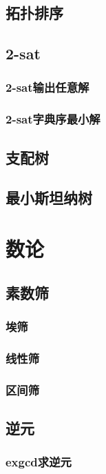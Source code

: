 ﻿\documentclass[a4paper,twocolumn]{article}
\begin{document}
\subsection{拓扑排序}

\subsection{2-sat}
\subsubsection{2-sat输出任意解}

\subsubsection{2-sat字典序最小解}

\subsection{支配树}

\subsection{最小斯坦纳树}

\section{数论}
\subsection{素数筛}
\subsubsection{埃筛}

\subsubsection{线性筛}

\subsubsection{区间筛}

\subsection{逆元}
\subsubsection{exgcd求逆元}

\end{document}
